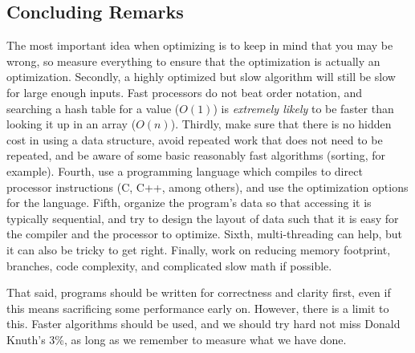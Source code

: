 \subsection{Concluding Remarks}

The most important idea when optimizing is to keep in mind that you may be wrong, so measure everything to ensure that the optimization
is actually an optimization. Secondly, a highly optimized but slow algorithm will still be slow for large enough inputs. Fast processors
do not beat order notation, and searching a hash table for a value ($O(1)$) is \textit{extremely likely} to be faster than looking it up
in an array ($O(n)$). Thirdly, make sure that there is no hidden cost in using a data structure, avoid repeated work that does not need to be repeated,
and be aware of some basic reasonably fast algorithms (sorting, for example). Fourth, use a programming language which compiles to direct processor
instructions (C, C++, among others), and use the optimization options for the language. Fifth, organize the program's data so that accessing it is
typically sequential, and try to design the layout of data such that it is easy for the compiler and the processor to optimize. Sixth, multi-threading
can help, but it can also be tricky to get right. Finally, work on reducing memory footprint, branches, code complexity, and complicated slow
math if possible.

That said, programs should be written for correctness and clarity first, even if this means sacrificing some performance early on. However,
there is a limit to this. Faster algorithms should be used, and we should try hard not miss Donald Knuth's 3\%, as long as we remember to measure
what we have done.
